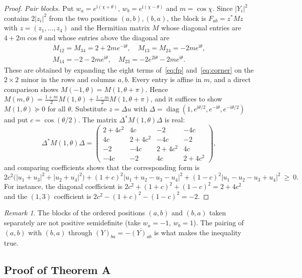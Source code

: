 \documentclass[11pt]{amsart}
\theoremstyle{definition}
\theoremstyle{remark}
\newtheorem{remark}[theorem]{Remark}
\begin{document}
\begin{proof}
\emph{Pair blocks.} Put $w_a=e^{\mathrm i(\chi+\theta)}$,
$w_b=e^{\mathrm i(\chi-\theta)}$ and $m=\cos\chi$. Since $|Y_i|^2$ contains
$2|z_i|^2$ from the two positions $(a,b),(b,a)$, the block is
$F_{ab}=z^*M z$ with $z=(z_1,\dots,z_4)$ and the Hermitian matrix $M$ whose
diagonal entries are $4+2m\cos\theta$ and whose entries above the diagonal are
\[
\begin{gathered}
M_{12}=M_{34}=2+2me^{-\mathrm i\theta},\quad
M_{13}=M_{24}=-2me^{\mathrm i\theta},\\
M_{14}=-2-2me^{\mathrm i\theta},\quad
M_{23}=-2e^{2\mathrm i\theta}-2me^{\mathrm i\theta}.
\end{gathered}
\]
These are obtained by expanding the eight terms of~\eqref{eq:fp}
and~\eqref{eq:corner} on the $2\times2$ minor in the rows and columns $a,b$.
Every entry is affine in $m$, and a direct comparison shows
$M(-1,\theta)=M(1,\theta+\pi)$. Hence
$M(m,\theta)=\tfrac{1+m}2M(1,\theta)+\tfrac{1-m}2M(1,\theta+\pi)$, and it
suffices to show $M(1,\theta)\succeq0$ for all $\theta$. Substitute
$z=\Delta u$ with $\Delta=\operatorname{diag}(1,e^{\mathrm i\theta/2},
e^{-\mathrm i\theta},e^{-\mathrm i\theta/2})$ and put $c=\cos(\theta/2)$. The
matrix $\Delta^*M(1,\theta)\Delta$ is real:
\[
\Delta^*M(1,\theta)\Delta=\begin{pmatrix}
2+4c^2&4c&-2&-4c\\ 4c&2+4c^2&-4c&-2\\ -2&-4c&2+4c^2&4c\\ -4c&-2&4c&2+4c^2
\end{pmatrix},
\]
and comparing coefficients shows that the corresponding form is
\[
2c^2\bigl(|u_1+u_3|^2+|u_2+u_4|^2\bigr)+(1+c)^2|u_1+u_2-u_3-u_4|^2
+(1-c)^2|u_1-u_2-u_3+u_4|^2\ \ge\ 0 .
\]
For instance, the diagonal coefficient is $2c^2+(1+c)^2+(1-c)^2=2+4c^2$ and
the $(1,3)$ coefficient is $2c^2-(1+c)^2-(1-c)^2=-2$.
\end{proof}

\begin{remark}
The blocks of the ordered positions $(a,b)$ and $(b,a)$ taken separately are
not positive semidefinite (take $w_a=-1$, $w_b=1$). The pairing of $(a,b)$ with
$(b,a)$ through $(Y)_{ba}=-\overline{(Y)_{ab}}$ is what makes the inequality
true.
\end{remark}

\subsection{Proof of Theorem A}
\end{document}

